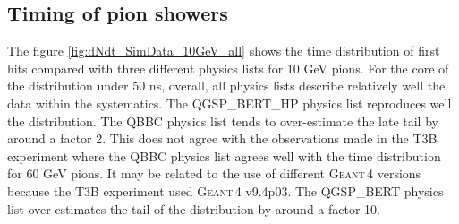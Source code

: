 \documentclass{JINST}
\newcommand\geant{\textsc{Geant\,4}\xspace}
\begin{document}
\subsection{Timing of pion showers}

The figure \ref{fig:dNdt_SimData_10GeV_all} shows the time distribution of first hits compared with three different physics lists for 10 GeV pions. For the core of the distribution under 50 ns, overall, all physics lists describe relatively well the data within the systematics. The QGSP\_BERT\_HP physics list reproduces well the distribution. The QBBC physics list tends to over-estimate the late tail by around a factor 2. This does not agree with the observations made in the T3B experiment \cite{Simon2013} where the QBBC physics list agrees well with the time distribution for 60 GeV pions. It may be related to the use of different \geant versions because the T3B experiment used \geant v9.4p03. The QGSP\_BERT physics list over-estimates the tail of the distribution by around a factor 10.
\end{document}
